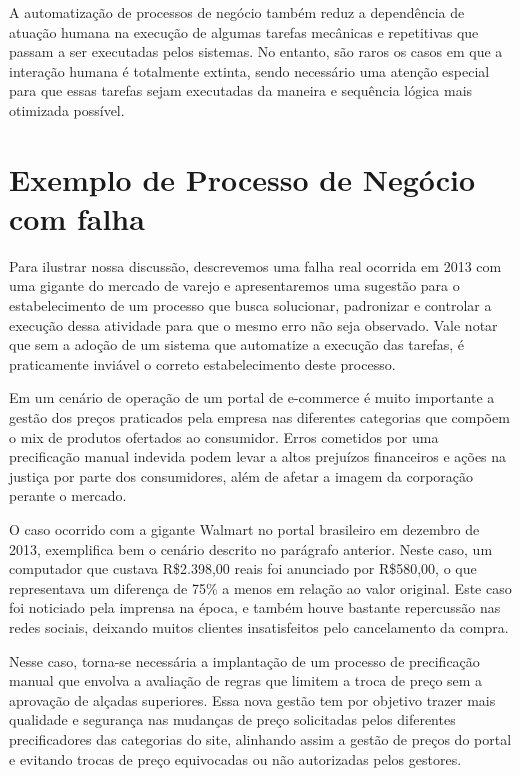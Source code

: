 A automatização de processos de negócio também reduz a dependência de atuação humana na execução de algumas tarefas mecânicas e repetitivas que passam a ser executadas pelos sistemas. No entanto, são raros os casos em que a interação humana é totalmente extinta, sendo necessário uma atenção especial para que essas tarefas sejam executadas da maneira e sequência lógica mais otimizada possível.

\section{Exemplo de Processo de Negócio com falha}\label{sec:introducao-caso_real}

Para ilustrar nossa discussão, descrevemos uma falha real ocorrida em 2013 com uma gigante do mercado de varejo e apresentaremos uma sugestão para o estabelecimento de um processo que busca solucionar, padronizar e controlar a execução dessa atividade para que o mesmo erro não seja observado. Vale notar que sem a adoção de um sistema que automatize a execução das tarefas, é praticamente inviável o correto estabelecimento deste processo.

Em um cenário de operação de um portal de e-commerce é muito importante a gestão dos preços praticados pela empresa nas diferentes categorias que compõem o mix de produtos ofertados ao consumidor. Erros cometidos por uma precificação manual indevida podem levar a altos prejuízos financeiros e ações na justiça por parte dos consumidores, além de afetar a imagem da corporação perante o mercado. 

O caso ocorrido com a gigante Walmart no portal brasileiro em dezembro de 2013, exemplifica bem o cenário descrito no parágrafo anterior. Neste caso, um computador que custava R\$2.398,00 reais foi anunciado por R\$580,00, o que representava um diferença de 75\% a menos em relação ao valor original. Este caso foi noticiado pela imprensa na época, e também houve bastante repercussão nas redes sociais, deixando muitos clientes insatisfeitos pelo cancelamento da compra\cite{noticia_erro_walmart}. 

Nesse caso, torna-se necessária a implantação de um processo de precificação manual que envolva a avaliação de regras que limitem a troca de preço sem a aprovação de alçadas superiores. Essa nova gestão tem por objetivo trazer mais qualidade e segurança nas mudanças de preço solicitadas pelos diferentes precificadores das categorias do site, alinhando assim a gestão de preços do portal e evitando trocas de preço equivocadas ou não autorizadas pelos gestores.

